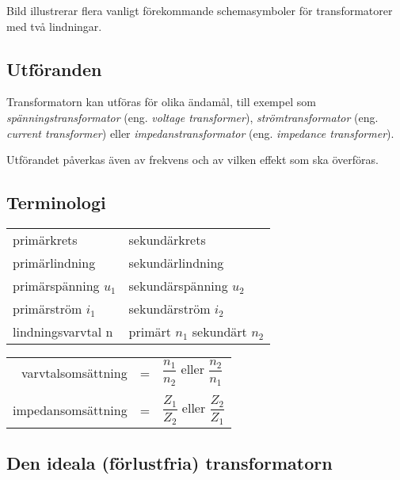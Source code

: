 Bild  illustrerar flera vanligt förekommande schemasymboler
för transformatorer med två lindningar.


\subsection{Utföranden}

Transformatorn kan utföras för olika ändamål, till exempel som
\emph{spänningstransformator} (eng. \emph{voltage transformer}),
\emph{strömtransformator} (eng. \emph{current transformer}) eller
\emph{impedanstransformator} (eng. \emph{impedance transformer}).

Utförandet påverkas även av frekvens och av vilken effekt som ska överföras.

\subsection{Terminologi}

\begin{center}
\begin{tabular}{ll}
primärkrets & sekundärkrets \\
primärlindning & sekundärlindning \\
primärspänning \(u_1\) &  sekundärspänning \(u_2\) \\
primärström \(i_1\) & sekundärström \(i_2\) \\
lindningsvarvtal n & primärt \(n_1\) sekundärt \(n_2\)
\end{tabular}
\end{center}

\begin{tabular}{rcl}
varvtalsomsättning &=& \(\dfrac{n_1}{n_2}\) eller \(\dfrac{n_2}{n_1}\) \\
&&\\
impedansomsättning &=& \(\dfrac{Z_1}{Z_2}\) eller \(\dfrac{Z_2}{Z_1}\) \\
\end{tabular}

\subsection{Den ideala (förlustfria) transformatorn}
\label{ideal_transformator}

